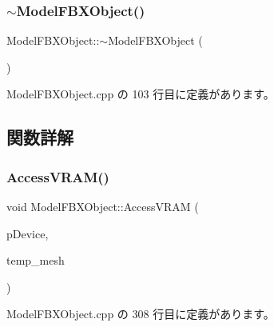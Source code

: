 \subsubsection{\texorpdfstring{$\sim$\+Model\+F\+B\+X\+Object()}{~ModelFBXObject()}}
{\footnotesize\ttfamily Model\+F\+B\+X\+Object\+::$\sim$\+Model\+F\+B\+X\+Object (\begin{DoxyParamCaption}{ }\end{DoxyParamCaption})\hspace{0.3cm}{\ttfamily [virtual]}}



 Model\+F\+B\+X\+Object.\+cpp の 103 行目に定義があります。



\subsection{関数詳解}
\mbox{\label{class_model_f_b_x_object_a930e90d4107466549946b1f318857954}} 
\subsubsection{\texorpdfstring{Access\+V\+R\+A\+M()}{AccessVRAM()}}
{\footnotesize\ttfamily void Model\+F\+B\+X\+Object\+::\+Access\+V\+R\+AM (\begin{DoxyParamCaption}\item[{L\+P\+D\+I\+R\+E\+C\+T3\+D\+D\+E\+V\+I\+C\+E9}]{p\+Device,  }\item[{std\+::vector$<$ \mbox{\hyperlink{struct_model_f_b_x_object_1_1_shaderbuff}{Shaderbuff}} $>$ $\ast$}]{temp\+\_\+mesh }\end{DoxyParamCaption})\hspace{0.3cm}{\ttfamily [private]}}



 Model\+F\+B\+X\+Object.\+cpp の 308 行目に定義があります。

